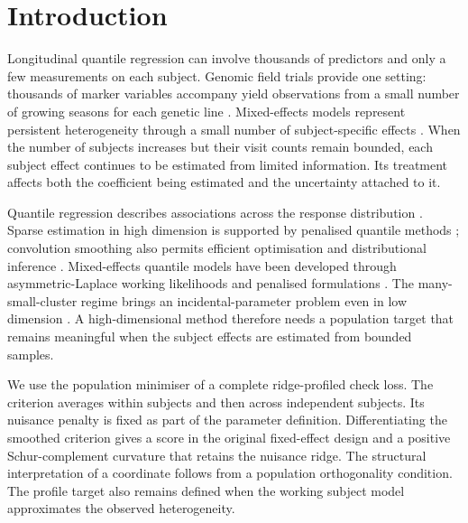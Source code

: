 \section{Introduction}\label{sec:introduction}

Longitudinal quantile regression can involve thousands of predictors and
only a few measurements on each subject. Genomic field trials provide
one setting: thousands of marker variables accompany yield observations
from a small number of growing seasons for each genetic line
\cite{xavier2017canopy}. Mixed-effects models represent persistent
heterogeneity through a small number of subject-specific effects
\cite{pinheiro2000,jiang2007}. When the number of subjects increases but
their visit counts remain bounded, each subject effect continues to be
estimated from limited information. Its treatment affects both the
coefficient being estimated and the uncertainty attached to it.

Quantile regression describes associations across the response
distribution \cite{koenker1978,koenker2005}. Sparse estimation in high
dimension is supported by penalised quantile methods
\cite{belloni2011,wang2012,tan2022}; convolution smoothing also permits
efficient optimisation and distributional inference
\cite{fernandes2021,he2021,yan2023}. Mixed-effects quantile models have
been developed through asymmetric-Laplace working likelihoods and
penalised formulations \cite{geraci2014,geraci2014jss,li2020}.
The many-small-cluster regime brings an incidental-parameter problem
even in low dimension \cite{battagliola2022}. A high-dimensional method
therefore needs a population target that remains meaningful when the
subject effects are estimated from bounded samples.

We use the population minimiser of a complete ridge-profiled check loss.
The criterion averages within subjects and then across independent
subjects. Its nuisance penalty is fixed as part of the parameter
definition. Differentiating the smoothed criterion gives a score in the
original fixed-effect design and a positive Schur-complement curvature
that retains the nuisance ridge. The structural interpretation of a
coordinate follows from a population orthogonality condition. The
profile target also remains defined when the working subject model
approximates the observed heterogeneity.

